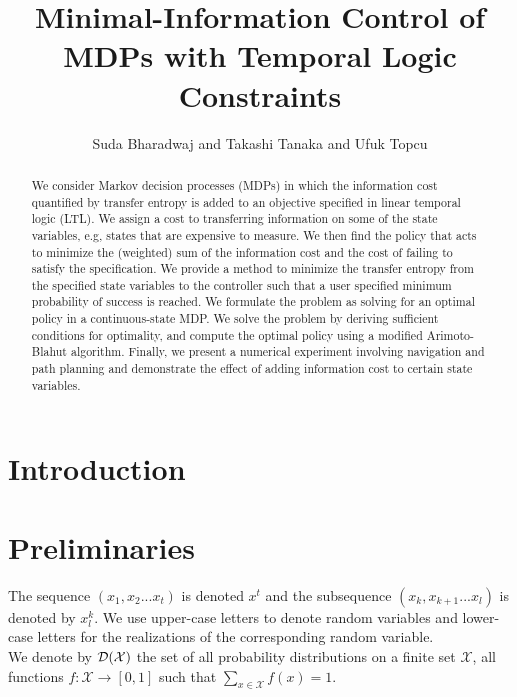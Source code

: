 \documentclass[letterpaper, 10 pt, conference]{ieeeconf}  %
\title{Minimal-Information Control of MDPs with Temporal Logic Constraints
}
\author{Suda Bharadwaj and Takashi Tanaka and Ufuk Topcu%
}
\begin{document}
\maketitle
\thispagestyle{empty}
\pagestyle{empty}


\begin{abstract}
We consider Markov decision processes (MDPs) in which the information cost quantified by transfer entropy is added to an objective specified in linear temporal logic (LTL). We assign a cost to transferring information on some of the state variables, e.g, states that are expensive to measure. We then find the policy that acts to minimize the (weighted) sum of the information cost and the cost of failing to satisfy the specification. We provide a method to minimize the transfer entropy from the specified state variables to the controller such that a user specified minimum probability of success is reached. We formulate the problem as solving for an optimal policy in a continuous-state MDP. We solve the problem by deriving sufficient conditions for optimality, and compute the optimal policy using a modified Arimoto-Blahut algorithm. Finally, we present a numerical experiment involving navigation and path planning and demonstrate the effect of adding information cost to certain state variables.
\end{abstract}


\section{Introduction}



\section{Preliminaries}
The sequence $\left(x_1,x_{2}...x_t \right)$ is denoted $x^t$ and the subsequence $\left(x_k,x_{k+1}...x_l \right)$ is denoted by $x_{l}^{k}$. We use upper-case letters to denote random variables and lower-case letters for the realizations of the corresponding random variable. \\
We denote by $\mathcal{D}(\mathcal{X})$ the set of all probability distributions on a finite
set $\mathcal{X}$, \ie all functions $f: \mathcal{X} \to [0,1]$ such that $\sum_{x\in \mathcal{X}}f(x)=1$. %
\end{document}
